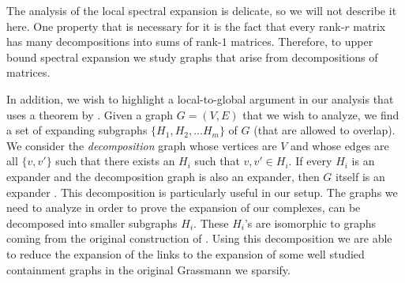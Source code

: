 \documentclass[10pt,a4paper]{article}
\theoremstyle{definition}
\theoremstyle{remark}
\newcommand{\set}[1]{\{#1\}}
\numberwithin{equation}{section}
\begin{document}
The analysis of the local spectral expansion is delicate, so we will not describe it here. One property that is necessary for it is the fact that every rank-\(r\) matrix has many decompositions into sums of rank-\(1\) matrices. Therefore, to upper bound spectral expansion we study graphs that arise from decompositions of matrices.

In addition, we wish to highlight a local-to-global argument in our analysis that uses a theorem by \cite{Madras2002}. Given a graph \(G = (V,E)\) that we wish to analyze, we find a set of expanding subgraphs \( \set{H_1, H_2, \dots H_m}\) of \(G\) (that are allowed to overlap). We consider the \emph{decomposition} graph whose vertices are \(V\) and whose edges are all \(\set{v,v'}\) such that there exists an \(H_i\) such that \(v,v' \in H_i\). If every \(H_i\) is an expander and the decomposition graph is also an expander, then \(G\) itself is an expander \cite{Madras2002}.
%
This decomposition is particularly useful in our setup. The graphs we need to analyze in order to prove the expansion of our complexes, can be decomposed into smaller subgraphs \(H_i\). These \(H_i\)'s are isomorphic to graphs coming from the original construction of \cite{Golowich2023}. Using this decomposition we are able to reduce the expansion of the links to the expansion of some well studied containment graphs in the original Grassmann we sparsify.
\end{document}
